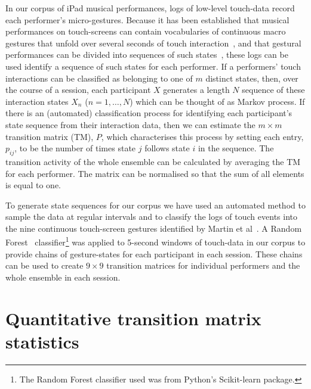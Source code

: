 \documentclass{sigchi}
\begin{document}
In our corpus of iPad musical performances, logs of low-level touch-data record each performer's micro-gestures. 
Because it has been
established that musical performances on touch-screens can contain 
vocabularies of continuous macro gestures that unfold over
several seconds of touch interaction~\cite{Martin:2014cr}, and that
gestural performances can be divided into sequences of such states~\cite{Pressing:1988uo}, these logs
 can be used identify a sequence of such states for each performer.
If a performers' touch interactions can be classified as belonging
to one of $m$ distinct states, then, over the course of a session, each
participant $X$ generates a length $N$ sequence of these interaction
states $X_n$ ($n = 1, \ldots, N$) which can be thought of as Markov
process.
If there is an (automated) classification process for identifying each
participant's state sequence from their interaction data, then we can
estimate the $m \times m$ transition matrix (TM), $P$, which characterises
this process by setting each entry, $p_{ij}$, to be the number of times
state $j$ follows state $i$ in the sequence. The transition activity
of the whole ensemble can be calculated by averaging the TM for each
performer. The matrix can be normalised so that the sum of all
elements is equal to one.

To generate state sequences for our corpus we have used an automated
method to sample the data at regular intervals and to classify the logs of touch events
into the nine continuous touch-screen gestures identified by Martin et
al~\cite{Martin:2015jk}. A Random Forest~\cite{Breiman:2001kx}
classifier\footnote{The Random Forest classifier used was from
  Python's Scikit-learn package\cite{scikit-learn}.} was applied to
5-second windows of touch-data in our corpus to provide chains of
gesture-states for each participant in each session. These chains can
be used to create $9 \times 9$ transition matrices for individual
performers and the whole ensemble in each session.

\section{Quantitative transition matrix statistics}
\label{sec:underst-impr-group}
\end{document}
